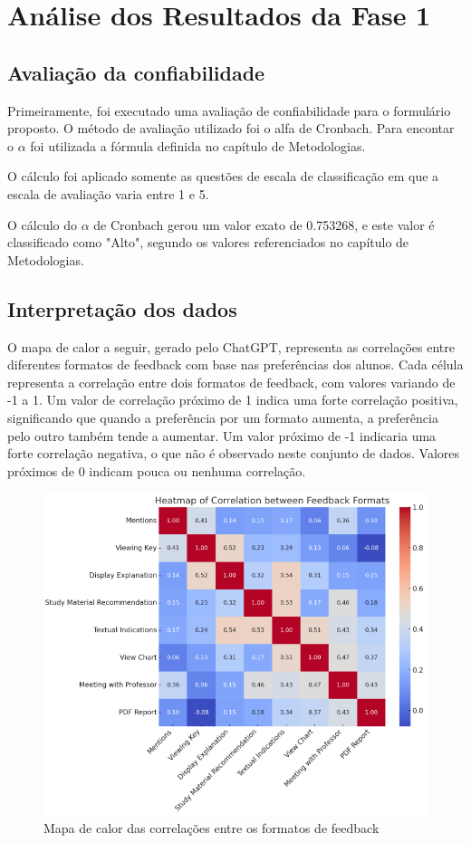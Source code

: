 \chapter{Análise dos Resultados da Fase 1}

\section{Avaliação da confiabilidade}

Primeiramente, foi executado uma avaliação de confiabilidade para o formulário proposto. O método de avaliação utilizado foi o alfa de Cronbach. Para encontar o $\alpha$ foi utilizada a fórmula definida no capítulo de Metodologias.

O cálculo foi aplicado somente as questões de escala de classificação em que a escala de avaliação varia entre 1 e 5.

O cálculo do $\alpha$ de Cronbach gerou um valor exato de 0.753268, e este valor é classificado como "Alto", segundo os valores referenciados no capítulo de Metodologias. 

\section{Interpretação dos dados}

O mapa de calor a seguir, gerado pelo ChatGPT, representa as correlações entre diferentes formatos de feedback com base nas preferências dos alunos. Cada célula representa a correlação entre dois formatos de feedback, com valores variando de -1 a 1. Um valor de correlação próximo de 1 indica uma forte correlação positiva, significando que quando a preferência por um formato aumenta, a preferência pelo outro também tende a aumentar. Um valor próximo de -1 indicaria uma forte correlação negativa, o que não é observado neste conjunto de dados. Valores próximos de 0 indicam pouca ou nenhuma correlação.

\begin{figure}[H]
\centering
\includegraphics{figuras/heatmapfeedback.png}
\caption{Mapa de calor das correlações entre os formatos de feedback}
\end{figure}

